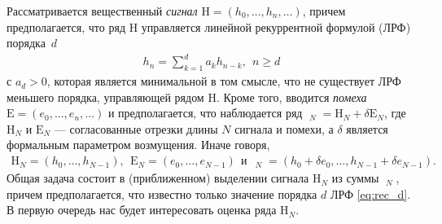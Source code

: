 \documentclass[specialist,
substylefile = spbu_report.rtx,
subf,href,colorlinks=true, 12pt]{disser}
\DeclareMathOperator\tildeH{\widetilde{\mathrm{H}}}
\begin{document}
	Рассматривается вещественный \emph{сигнал} $\mathrm{H}=(h_0,\ldots, h_n,\ldots)$, причем предполагается, что ряд $\mathrm{H}$ управляется линейной
	рекуррентной формулой  (ЛРФ) порядка~$d$
	\begin{gather}
		\label{eq:rec_d}
		h_n = \sum\limits_{k=1}^d a_kh_{n-k}, \ \ n \geqslant d
	\end{gather}
	с $a_d>0$, которая является минимальной в том смысле, что  не существует ЛРФ меньшего порядка, управляющей рядом $\mathrm{H}$.
	Кроме того, вводится \emph{помеха} $\mathrm{E}=(e_0,\ldots, e_n,\ldots)$ и предполагается, что наблюдается ряд $\tildeH_N=\mathrm{H}_N+\delta
	\mathrm{E}_N$, где  $\mathrm{H}_N$ и $\mathrm{E}_N$ --- согласованные отрезки длины $N$ сигнала и помехи, а
	$\delta$ является формальным параметром возмущения. Иначе говоря,
	\begin{gather*}
		\mathrm{H}_N=(h_0, \ldots, h_{N-1}), \ \ \mathrm{E}_N=(e_0, \ldots, e_{N-1}) \ \ \text{и}\ \
		\tildeH_N=(h_0+\delta e_0, \ldots, h_{N-1}+\delta e_{N-1}).
	\end{gather*}
	Общая задача состоит в (приближенном) выделении сигнала $\mathrm{H}_N$ из суммы $\tildeH_N$, причем предполагается, что известно только
	значение порядка $d$ ЛРФ \eqref{eq:rec_d}.
	В первую очередь нас будет интересовать оценка ряда $\mathrm{H}_N$.
\end{document}
